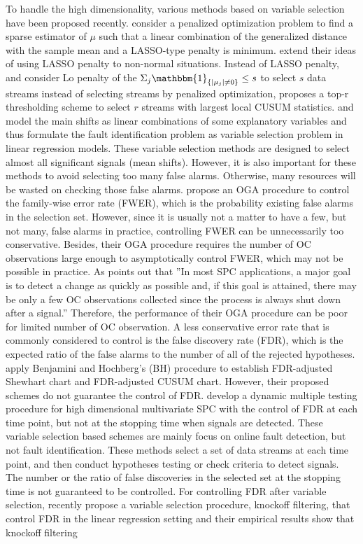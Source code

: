 \documentclass[a4paper,12pt]{article}
\begin{document}
To handle the high dimensionality, various methods based on variable selection have been proposed recently. \cite{wang2009high} consider a penalized optimization problem to find a sparse estimator of $\mu$ such that a linear combination of the generalized distance with the sample mean and a LASSO-type penalty is minimum. \cite{liang2016robust} extend their ideas of using LASSO penalty to non-normal situations. Instead of LASSO penalty, \cite{jiang2012variable} and \cite{li2017robust} consider Lo penalty of the $\Sigma_j \mathbbm{1}_{ \{|\mu_j| \ne 0 \}} \le s$ to select $s$ data streams instead of selecting streams by penalized optimization, \cite{mei2011quickest} proposes a top-r thresholding scheme to select $r$ streams with largest local CUSUM statistics. \cite{capizzi2011least} and \cite{ing2017multiple} model the main shifts as linear combinations of some explanatory variables and thus formulate the fault identification problem as variable selection problem in linear regression models. These variable selection methods are designed to select almost all significant signals (mean shifts). However, it is also important for these methods to avoid selecting too many false alarms. Otherwise, many resources will be wasted on checking those false alarms. \cite{ing2017multiple} propose an OGA procedure to control the family-wise error rate (FWER), which is the probability existing false alarms in the selection set. However, since it is usually not a matter to have a few, but not many, false alarms in practice, controlling FWER can be unnecessarily too conservative. Besides, their OGA procedure requires the number of OC observations large enough to asymptotically control FWER, which may not be possible in practice. As \cite{li2020diagnostic} points out that ''In most SPC applications, a major goal is to detect a change as quickly as possible and, if this goal is attained, there may be only a few OC observations collected since the process is always shut down after a signal.'' Therefore, the performance of their OGA procedure can be poor for limited number of OC observation. A less conservative error rate that is commonly considered to control is the false discovery rate (FDR), which is the expected ratio of the false alarms to the number of all of the rejected hypotheses. \cite{li2009false} apply Benjamini and Hochberg's (BH) procedure to establish FDR-adjusted Shewhart chart and FDR-adjusted CUSUM chart. However, their proposed schemes do not guarantee the control of FDR. \cite{du2018line} develop a dynamic multiple testing procedure for high dimensional multivariate SPC with the control of FDR at each time point, but not at the stopping time when signals are detected. These variable selection based schemes are mainly focus on online fault detection, but not fault identification. These methods select a set of data streams at each time point, and then conduct hypotheses testing or check criteria to detect signals. The number or the ratio of false discoveries in the selected set at the stopping time is not guaranteed to be controlled. For controlling FDR after variable selection, recently \cite{barber2015controlling} propose a variable selection procedure, knockoff filtering, that control FDR in the linear regression setting and their empirical results show that knockoff filtering 
\end{document}
